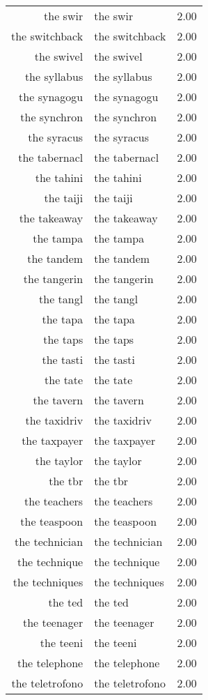 \begin{table}[ht]
\begin{tabular}{rlr}
  the swir & the swir & 2.00 \\ 
  the switchback & the switchback & 2.00 \\ 
  the swivel & the swivel & 2.00 \\ 
  the syllabus & the syllabus & 2.00 \\ 
  the synagogu & the synagogu & 2.00 \\ 
  the synchron & the synchron & 2.00 \\ 
  the syracus & the syracus & 2.00 \\ 
  the tabernacl & the tabernacl & 2.00 \\ 
  the tahini & the tahini & 2.00 \\ 
  the taiji & the taiji & 2.00 \\ 
  the takeaway & the takeaway & 2.00 \\ 
  the tampa & the tampa & 2.00 \\ 
  the tandem & the tandem & 2.00 \\ 
  the tangerin & the tangerin & 2.00 \\ 
  the tangl & the tangl & 2.00 \\ 
  the tapa & the tapa & 2.00 \\ 
  the taps & the taps & 2.00 \\ 
  the tasti & the tasti & 2.00 \\ 
  the tate & the tate & 2.00 \\ 
  the tavern & the tavern & 2.00 \\ 
  the taxidriv & the taxidriv & 2.00 \\ 
  the taxpayer & the taxpayer & 2.00 \\ 
  the taylor & the taylor & 2.00 \\ 
  the tbr & the tbr & 2.00 \\ 
  the teachers & the teachers & 2.00 \\ 
  the teaspoon & the teaspoon & 2.00 \\ 
  the technician & the technician & 2.00 \\ 
  the technique & the technique & 2.00 \\ 
  the techniques & the techniques & 2.00 \\ 
  the ted & the ted & 2.00 \\ 
  the teenager & the teenager & 2.00 \\ 
  the teeni & the teeni & 2.00 \\ 
  the telephone & the telephone & 2.00 \\ 
  the teletrofono & the teletrofono & 2.00 \\ 

\end{tabular}
\end{table}
